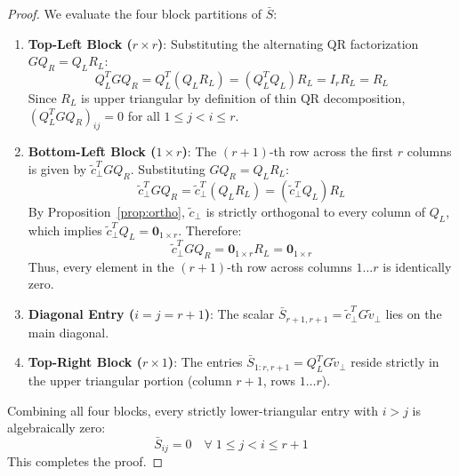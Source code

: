 \documentclass[10pt,twocolumn,letterpaper]{article}
\begin{document}
\begin{proof}
We evaluate the four block partitions of $\bar{S}$:
\begin{enumerate}
    \item \textbf{Top-Left Block ($r \times r$)}: Substituting the alternating QR factorization $G Q_R = Q_L R_L$:
    \begin{equation}
        Q_L^T G Q_R = Q_L^T (Q_L R_L) = (Q_L^T Q_L) R_L = I_r R_L = R_L
    \end{equation}
    Since $R_L$ is upper triangular by definition of thin QR decomposition, $(Q_L^T G Q_R)_{ij} = 0$ for all $1 \le j < i \le r$.
    \item \textbf{Bottom-Left Block ($1 \times r$)}: The $(r+1)$-th row across the first $r$ columns is given by $\tilde{c}_\perp^T G Q_R$. Substituting $G Q_R = Q_L R_L$:
    \begin{equation}
        \tilde{c}_\perp^T G Q_R = \tilde{c}_\perp^T (Q_L R_L) = (\tilde{c}_\perp^T Q_L) R_L
    \end{equation}
    By Proposition~\ref{prop:ortho}, $\tilde{c}_\perp$ is strictly orthogonal to every column of $Q_L$, which implies $\tilde{c}_\perp^T Q_L = \mathbf{0}_{1 \times r}$. Therefore:
    \begin{equation}
        \tilde{c}_\perp^T G Q_R = \mathbf{0}_{1 \times r} R_L = \mathbf{0}_{1 \times r}
    \end{equation}
    Thus, every element in the $(r+1)$-th row across columns $1 \dots r$ is identically zero.
    \item \textbf{Diagonal Entry ($i = j = r+1$)}: The scalar $\bar{S}_{r+1, r+1} = \tilde{c}_\perp^T G \tilde{v}_\perp$ lies on the main diagonal.
    \item \textbf{Top-Right Block ($r \times 1$)}: The entries $\bar{S}_{1:r, r+1} = Q_L^T G \tilde{v}_\perp$ reside strictly in the upper triangular portion (column $r+1$, rows $1 \dots r$).
\end{enumerate}
Combining all four blocks, every strictly lower-triangular entry with $i > j$ is algebraically zero:
\begin{equation}
    \bar{S}_{ij} = 0 \quad \forall \; 1 \le j < i \le r+1
\end{equation}
This completes the proof.
\end{proof}
\end{document}

